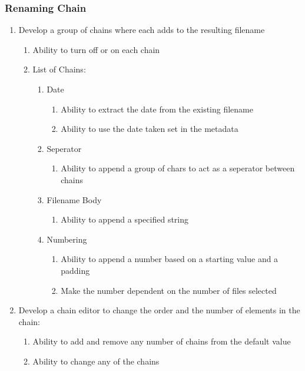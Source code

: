\documentclass[11pt]{article}
\begin{document}
\subsubsection{Renaming Chain}
\begin{enumerate}
    \item Develop a group of chains where each adds to the resulting filename
    \begin{enumerate}
        \item Ability to turn off or on each chain
        \item List of Chains:
        \begin{enumerate}
            \item Date
            \begin{enumerate}
                \item Ability to extract the date from the existing filename
                \item Ability to use the date taken set in the metadata
            \end{enumerate}
            \item Seperator
            \begin{enumerate}
                \item Ability to append a group of chars to act as a seperator between chains
            \end{enumerate}
            \item Filename Body
            \begin{enumerate}
                \item Ability to append a specified string
            \end{enumerate}
            \item Numbering
            \begin{enumerate}
                \item Ability to append a number based on a starting value and a padding
                \item Make the number dependent on the number of files selected
            \end{enumerate}
        \end{enumerate}
    \end{enumerate}
    \item Develop a chain editor to change the order and the number of elements in the chain:
    \begin{enumerate}
        \item Ability to add and remove any number of chains from the default value
        \item Ability to change any of the chains
    \end{enumerate}
\end{enumerate}
\end{document}
